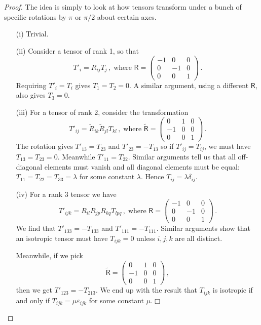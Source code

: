 \documentclass{article}
\theoremstyle{plain}\theoremheaderfont{\normalfont\itshape}\theorembodyfont{\rmfamily}\theoremseparator{.}\newtheorem*{rem}{Remark}\newtheorem*{ex}{Example}\newtheorem*{proof}{Proof}\newtheorem*{altp}{Alternative proof}
\theoremstyle{plain}\theoremheaderfont{\normalfont\bfseries}\theorembodyfont{\rmfamily}\theoremseparator{.}\newtheorem{thm}{Theorem}[section]\newtheorem{lem}[thm]{Lemma}\newtheorem{prop}[thm]{Proposition}\newtheorem*{cor}{Corollary}\newtheorem{defn}[thm]{Definition}\newtheorem{clm}[thm]{Claim}\newtheorem{clminproof}{Claim}
\theoremstyle{break}\theoremheaderfont{\normalfont\itshape}\theorembodyfont{\rmfamily}\theoremseparator{.\medskip}\newtheorem*{proofskip}{Proof}\newtheorem*{exs}{Examples}\newtheorem*{rems}{Remarks}
\theoremstyle{break}\theoremheaderfont{\normalfont\bfseries}\theorembodyfont{\rmfamily}\theoremseparator{.\medskip}\newtheorem{lemskip}[thm]{Lemma}\newtheorem{defnskip}[thm]{Definition}\newtheorem{propskip}[thm]{Proposition}\newtheorem{thmskip}[thm]{Theorem}
\numberwithin{equation}{section}
\newcommand{\qed}{\hfill\ensuremath{\Box}}
\begin{document}
	\begin{proof}
		The idea is simply to look at how tensors transform under a bunch of specific rotations by \(\pi\) or \(\pi/2\) about certain axes.
		\begin{enumerate}[topsep=0pt]
			\item[(i)] Trivial.
			\item[(ii)] Consider a tensor of rank 1, so that
			\[T'_i=R_{ij}T_j\,,\;\text{where }\mathsf{R}=\begin{pmatrix}
				-1 & 0 & 0\\
				0 & -1 & 0\\
				0 & 0 & 1
			\end{pmatrix}\,.\]
			Requiring \(T'_i=T_i\) gives \(T_1=T_2=0\). A similar argument, using a different \(\mathsf{R}\),	also gives \(T_3=0\).
			\item[(iii)] For a tensor of rank 2, consider the transformation
			\[T'_{ij}=\tilde{R}_{ik}\tilde{R}_{jl}T_{kl}\,,\;\text{where }\mathsf{\tilde{R}}=\begin{pmatrix}
				0 & 1 & 0\\
				-1 & 0 & 0\\
				0 & 0 & 1
			\end{pmatrix}\,.\]
			The rotation gives \(T'_{13}=T_{23}\) and \(T'_{23}=-T_{13}\) so if \(T'_{ij}=T_{ij}\), we must have \(T_{13}=T_{23}=0\). Meanwhile \(T'_{11}=T_{22}\). Similar arguments tell us that all off-diagonal elements must vanish and all diagonal elements must be equal: \(T_{11}=T_{22}=T_{33}=\lambda\) for some constant \(\lambda\). Hence \(T_{ij}=\lambda\delta_{ij}\).
			\item[(iv)] For a rank 3 tensor we have
			\[T'_{ijk}=R_{il}R_{jp}R_{kq}T_{lpq}\,,\;\text{where }\mathsf{R}=\begin{pmatrix}
				-1 & 0 & 0\\
				0 & -1 & 0\\
				0 & 0 & 1
			\end{pmatrix}\,.\]
			We find that \(T'_{133}=-T_{133}\) and \(T'_{111}=-T_{111}\). Similar arguments show that an isotropic tensor must have \(T_{ijk}=0\) unless \(i,j,k\) are all distinct.
			
			Meanwhile, if we pick
			\[\mathsf{\tilde{R}}=\begin{pmatrix}
				0 & 1 & 0\\
				-1 & 0 & 0\\
				0 & 0 & 1
			\end{pmatrix}\,,\]
			then we get \(T'_{123}=-T_{213}\). We end up with the result that \(T_{ijk}\) is isotropic if and only if \(T_{ijk}=\mu\varepsilon_{ijk}\) for some constant \(\mu\).\qed
		\end{enumerate}
	\end{proof}
\end{document}

